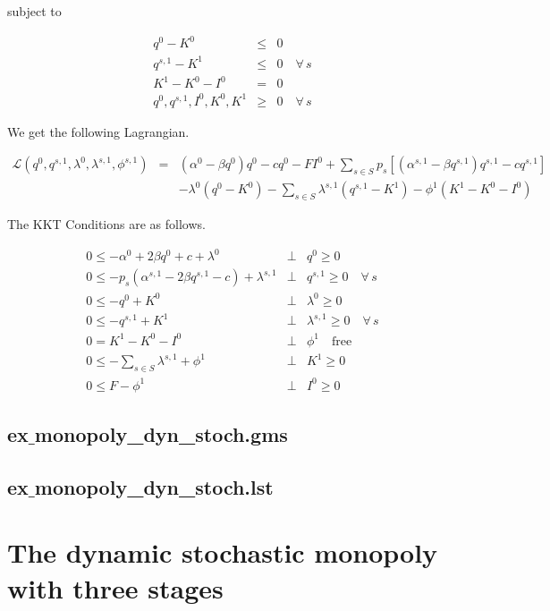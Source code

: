 \documentclass[11pt,a4paper]{article}
\begin{document}
subject to

\begin{eqnarray*}
	q^0 - K^0 &\leq& 0\\
	q^{s,1} - K^{1} &\leq& 0\quad\forall\, s\\
        K^{1} - K^0 - I^0 &=& 0\\
	q^0,q^{s,1},I^0,K^0,K^{1} &\geq& 0\quad\forall\, s 
\end{eqnarray*}
 
We get the following Lagrangian.

\begin{eqnarray*}
	\mathcal{L}(q^0,q^{s,1},\lambda^0,\lambda^{s,1},\phi^{s,1})&=& (\alpha^0-\beta q^0)q^0 - cq^0 - FI^0 + \sum_{s\in S}p_s\left[(\alpha^{s,1}-\beta q^{s,1})q^{s,1} - cq^{s,1}\right]  \\
        && - \lambda^0(q^0-K^0) - \sum_{s\in S}\lambda^{s,1}(q^{s,1}-K^{1}) - \phi^{1}(K^{1}-K^0-I^0)
\end{eqnarray*}

The KKT Conditions are as follows.

\begin{eqnarray*}
	0 \leq -\alpha^0 + 2\beta q^0 + c + \lambda^0 &\bot& q^0 \geq 0\\
        0 \leq -p_s\left(\alpha^{s,1} - 2\beta q^{s,1} - c\right) + \lambda^{s,1} &\bot& q^{s,1} \geq 0\quad\forall\,s\\
	0 \leq -q^0 + K^0 &\bot& \lambda^0 \geq 0 \\
        0 \leq -q^{s,1} + K^{1} &\bot& \lambda^{s,1} \geq 0 \quad\forall\,s\\
        0 = K^1 - K^0 - I^0 &\bot& \phi^1 \quad \mbox{free} \\
        0 \leq -\sum_{s\in S}\lambda^{s,1} + \phi^{1} &\bot& K^1 \geq 0 \\
        0 \leq F - \phi^{1} &\bot& I^0 \geq 0 
\end{eqnarray*}

\subsection*{ex$\_$monopoly\_dyn\_stoch.gms}


\subsection*{ex$\_$monopoly\_dyn\_stoch.lst}


\section{The dynamic stochastic monopoly with three stages}
\end{document}
